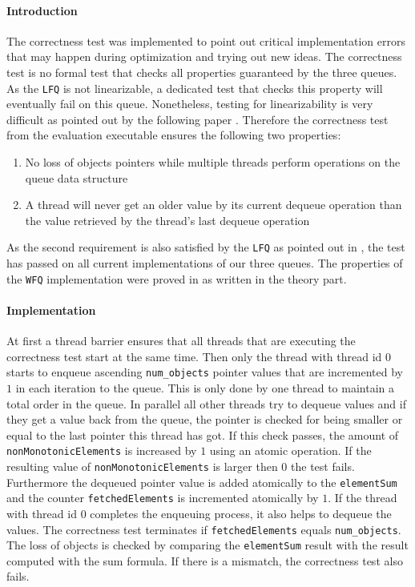 \documentclass{article}
\newcommand{\LFQ}{\texttt{LFQ}}
\newcommand{\WFQ}{\texttt{WFQ}}
\begin{document}
\paragraph{Introduction}
The correctness test was implemented to point out critical implementation errors that may happen during optimization and trying out new ideas. The correctness test is no formal test that checks all properties guaranteed by the three queues. As the \LFQ{} is not linearizable, a dedicated test that checks this property will eventually fail on this queue. Nonetheless, testing for linearizability is very difficult as pointed out by the following paper \cite{LIN}. Therefore the correctness test from the evaluation executable ensures the following two properties:
\begin{enumerate}
    \item No loss of objects pointers while multiple threads perform operations on the queue data structure
    \item A thread will never get an older value by its current dequeue operation than the value retrieved by the thread's last dequeue operation
\end{enumerate}
As the second requirement is also satisfied by the \LFQ{} as pointed out in \cite {LFQEXPL}, the test has passed on all current implementations of our three queues.
The properties of the \WFQ{} implementation were proved in \cite{WFQ} as written in the theory part.
\paragraph{Implementation}
At first a thread barrier ensures that all threads that are executing the correctness test start at the same time. Then only the thread with thread id $0$ starts to enqueue ascending \texttt{num\_objects} pointer values that are incremented by $1$ in each iteration to the queue. This is only done by one thread to maintain a total order in the queue. In parallel all other threads try to dequeue values and if they get a value back from the queue, the pointer is checked for being smaller or equal to the last pointer this thread has got. If this check passes, the amount of \texttt{nonMonotonicElements} is increased by $1$ using an atomic operation. If the resulting value of \texttt{nonMonotonicElements} is larger then $0$ the test fails. Furthermore the dequeued pointer value is added atomically to the \texttt{elementSum} and the counter \texttt{fetchedElements} is incremented atomically by $1$. If the thread with thread id $0$ completes the enqueuing process, it also helps to dequeue the values. The correctness test terminates if \texttt{fetchedElements} equals \texttt{num\_objects}. The loss of objects is checked by comparing the \texttt{elementSum} result with the result computed with the sum formula. If there is a mismatch, the correctness test also fails.
\clearpage
\end{document}
